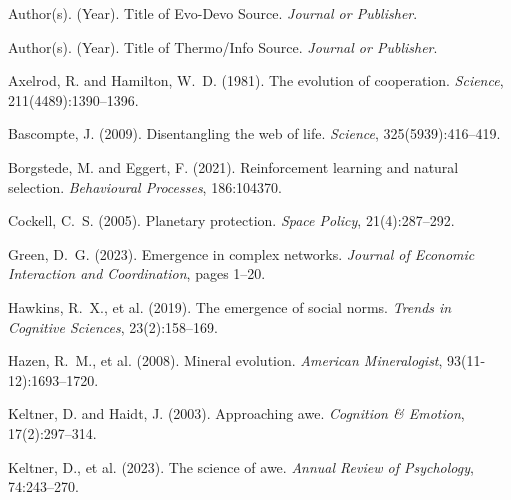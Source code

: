 \documentclass[12pt,openany]{book}
\begin{document}

\begin{thebibliography}{}

Author(s). (Year).
\newblock Title of Evo-Devo Source.
\newblock \emph{Journal or Publisher}.

Author(s). (Year).
\newblock Title of Thermo/Info Source.
\newblock \emph{Journal or Publisher}.

Axelrod, R. and Hamilton, W.~D. (1981).
\newblock The evolution of cooperation.
\newblock \emph{Science}, 211(4489):1390--1396.

Bascompte, J. (2009).
\newblock Disentangling the web of life.
\newblock \emph{Science}, 325(5939):416--419.

Borgstede, M. and Eggert, F. (2021).
\newblock Reinforcement learning and natural selection.
\newblock \emph{Behavioural Processes}, 186:104370.

Cockell, C.~S. (2005).
\newblock Planetary protection.
\newblock \emph{Space Policy}, 21(4):287--292.

Green, D.~G. (2023).
\newblock Emergence in complex networks.
\newblock \emph{Journal of Economic Interaction and Coordination}, pages 1--20.

Hawkins, R.~X., et al. (2019).
\newblock The emergence of social norms.
\newblock \emph{Trends in Cognitive Sciences}, 23(2):158--169.

Hazen, R.~M., et al. (2008).
\newblock Mineral evolution.
\newblock \emph{American Mineralogist}, 93(11-12):1693--1720.

Keltner, D. and Haidt, J. (2003).
\newblock Approaching awe.
\newblock \emph{Cognition \& Emotion}, 17(2):297--314.

Keltner, D., et al. (2023).
\newblock The science of awe.
\newblock \emph{Annual Review of Psychology}, 74:243--270.


\end{thebibliography}
\end{document}
